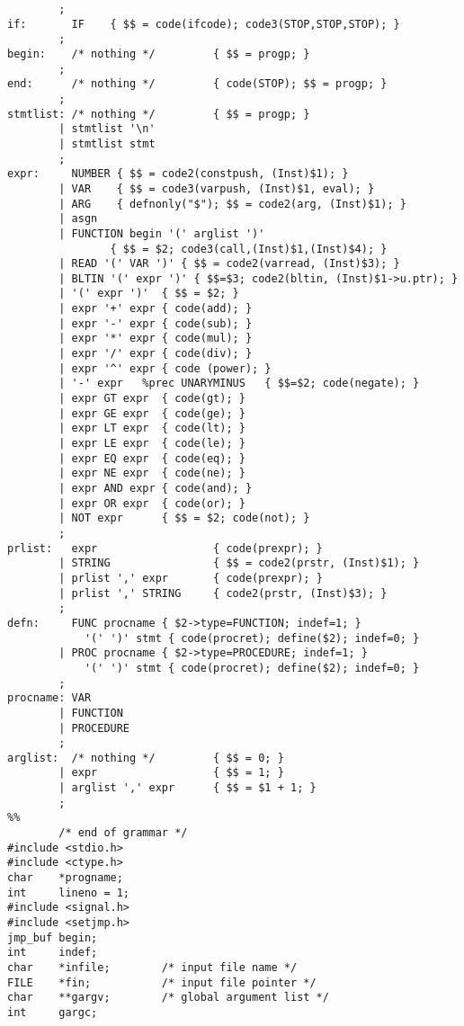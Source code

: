 \begin{verbatim}
        ;
if:       IF    { $$ = code(ifcode); code3(STOP,STOP,STOP); }
        ;
begin:    /* nothing */         { $$ = progp; }
        ;
end:      /* nothing */         { code(STOP); $$ = progp; }
        ;
stmtlist: /* nothing */         { $$ = progp; }
        | stmtlist '\n'
        | stmtlist stmt
        ;
expr:     NUMBER { $$ = code2(constpush, (Inst)$1); }
        | VAR    { $$ = code3(varpush, (Inst)$1, eval); }
        | ARG    { defnonly("$"); $$ = code2(arg, (Inst)$1); }
        | asgn
        | FUNCTION begin '(' arglist ')'
                { $$ = $2; code3(call,(Inst)$1,(Inst)$4); }
        | READ '(' VAR ')' { $$ = code2(varread, (Inst)$3); }
        | BLTIN '(' expr ')' { $$=$3; code2(bltin, (Inst)$1->u.ptr); }
        | '(' expr ')'  { $$ = $2; }
        | expr '+' expr { code(add); }
        | expr '-' expr { code(sub); }
        | expr '*' expr { code(mul); }
        | expr '/' expr { code(div); }
        | expr '^' expr { code (power); }
        | '-' expr   %prec UNARYMINUS   { $$=$2; code(negate); }
        | expr GT expr  { code(gt); }
        | expr GE expr  { code(ge); }
        | expr LT expr  { code(lt); }
        | expr LE expr  { code(le); }
        | expr EQ expr  { code(eq); }
        | expr NE expr  { code(ne); }
        | expr AND expr { code(and); }
        | expr OR expr  { code(or); }
        | NOT expr      { $$ = $2; code(not); }
        ;
prlist:   expr                  { code(prexpr); }
        | STRING                { $$ = code2(prstr, (Inst)$1); }
        | prlist ',' expr       { code(prexpr); }
        | prlist ',' STRING     { code2(prstr, (Inst)$3); }
        ;
defn:     FUNC procname { $2->type=FUNCTION; indef=1; }
            '(' ')' stmt { code(procret); define($2); indef=0; }
        | PROC procname { $2->type=PROCEDURE; indef=1; }
            '(' ')' stmt { code(procret); define($2); indef=0; }
        ;
procname: VAR
        | FUNCTION
        | PROCEDURE
        ;
arglist:  /* nothing */         { $$ = 0; }
        | expr                  { $$ = 1; }
        | arglist ',' expr      { $$ = $1 + 1; }
        ;
%%
        /* end of grammar */
#include <stdio.h>
#include <ctype.h>
char    *progname;
int     lineno = 1;
#include <signal.h>
#include <setjmp.h>
jmp_buf begin;
int     indef;
char    *infile;        /* input file name */
FILE    *fin;           /* input file pointer */
char    **gargv;        /* global argument list */
int     gargc;


\end{verbatim}
